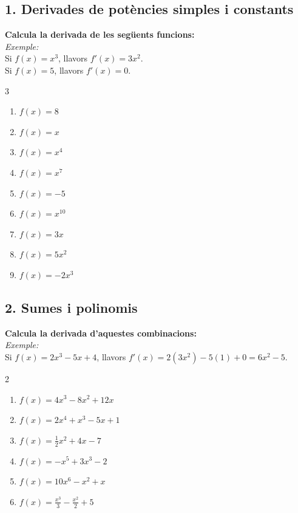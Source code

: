 \documentclass[12pt,a4paper]{article}
\begin{document}
\subsection*{1. Derivades de potències simples i constants}
\textbf{Calcula la derivada de les següents funcions:} \\[0.2cm]
\textit{Exemple:} \\ [0.2cm]
Si $f(x) = x^3$, llavors $f'(x) = 3x^2$.\\[0.2cm]
Si $f(x) = 5$, llavors $f'(x) = 0$.


\begin{multicols}{3}
\begin{enumerate}[label=\alph*)]
    \item $f(x) = 8$
    \item $f(x) = x$
    \item $f(x) = x^4$
    \item $f(x) = x^7$
    \item $f(x) = -5$
    \item $f(x) = x^{10}$
    \item $f(x) = 3x$
    \item $f(x) = 5x^2$
    \item $f(x) = -2x^3$
\end{enumerate}
\end{multicols}

\subsection*{2. Sumes i polinomis}
\textbf{Calcula la derivada d'aquestes combinacions:}\\[0.2cm]
\textit{Exemple:}  \\[0.2cm]
Si $f(x) = 2x^3 - 5x + 4$, llavors $f'(x) = 2(3x^2) - 5(1) + 0 = 6x^2 - 5$.


\begin{multicols}{2}
\begin{enumerate}[label=\alph*)]
    \item $f(x) = 4x^3 - 8x^2 + 12x$
    \item $f(x) = 2x^4 + x^3 - 5x + 1$
    \item $f(x) = \frac{1}{2}x^2 + 4x - 7$
    \item $f(x) = -x^5 + 3x^3 - 2$
    \item $f(x) = 10x^6 - x^2 + x$
    \item $f(x) = \frac{x^3}{3} - \frac{x^2}{2} + 5$
\end{enumerate}
\end{multicols}
\end{document}
